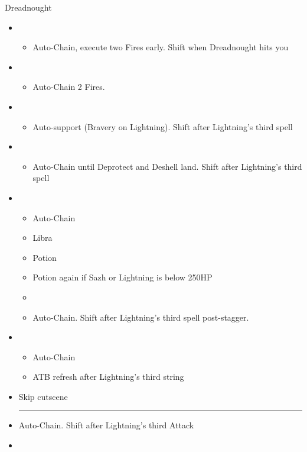 \begin{battle}[2:16]{Dreadnought}
		\begin{itemize}
			\item \fourth
			      \begin{itemize}
				      \item Auto-Chain, execute two Fires early. Shift when Dreadnought hits you
			      \end{itemize}
			\item \fifth
			      \begin{itemize}
				      \item Auto-Chain 2 Fires.
			      \end{itemize}
			\item \sixth
			      \begin{itemize}
				      \item Auto-support (Bravery on Lightning). Shift after Lightning’s third spell
			      \end{itemize}
			\item \fourth
			      \begin{itemize}
				      \item Auto-Chain until Deprotect and Deshell land. Shift after Lightning’s third spell
			      \end{itemize}
			\item \fifth
			      \begin{itemize}
				      \item Auto-Chain
				      \item Libra
				      \item Potion
				      \item Potion again if Sazh or Lightning is below 250HP
				      \item \stagger
				      \item Auto-Chain. Shift after Lightning’s third spell post-stagger.
			      \end{itemize}
			\item \first
			      \begin{itemize}
				      \item Auto-Chain
				      \item ATB refresh after Lightning's third string
			      \end{itemize}
			\item Skip cutscene
			\newline
			\rule{.9\columnwidth}{1pt}
			\item Auto-Chain. Shift after Lightning’s third Attack
			\item \sixth

\end{itemize}
\end{battle}

